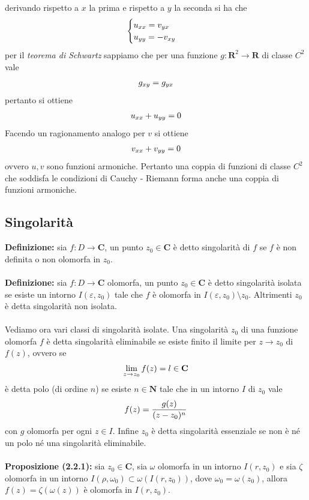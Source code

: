 \documentclass{article}
\begin{document}
derivando rispetto a $x$ la prima e rispetto a $y$ la seconda si ha che
\begin{gather}
    \begin{cases}
        u_{xx} = v_{yx} \\
        u_{yy} = -v_{xy}
    \end{cases} \notag
\end{gather}
per il \textit{teorema di Schwartz} sappiamo che per una funzione $g : \mathbf{R}^2 \longrightarrow \mathbf{R}$ di classe $C^2$ vale
\begin{gather}
    g_{xy} = g_{yx} \notag
\end{gather}
pertanto si ottiene
\begin{gather}
    u_{xx} + u_{yy} = 0 \notag
\end{gather}
Facendo un ragionamento analogo per $v$ si ottiene
\begin{gather}
    v_{xx} + v_{yy} = 0 \notag
\end{gather}
ovvero $u, v$ sono funzioni armoniche. Pertanto una coppia di funzioni di classe $C^2$ che soddisfa le condizioni di Cauchy - Riemann forma anche una coppia di funzioni armoniche.

\newpage
\subsection{Singolarità}
\textbf{Definizione:} sia $f : D \longrightarrow \mathbf{C}$, un punto $z_0 \in \mathbf{C}$ è detto singolarità di $f$ se $f$ è non definita o non olomorfa in $z_0$. \\ \\
\textbf{Definizione:} sia $f : D \longrightarrow \mathbf{C}$ olomorfa, un punto $z_0 \in \mathbf{C}$ è detto singolarità isolata se esiste un intorno $I(\varepsilon, z_0)$ tale che $f$ è olomorfa in $I(\varepsilon, z_0) \setminus z_0$. Altrimenti $z_0$ è detta singolarità non isolata. \\ \\
Vediamo ora vari classi di singolarità isolate. Una singolarità $z_0$ di una funzione olomorfa $f$ è detta singolarità eliminabile se esiste finito il limite per $z \rightarrow z_0$ di $f(z)$, ovvero se
\begin{gather}
    \lim_{z \rightarrow z_0}f(z) = l \in \mathbf{C} \notag
\end{gather}
è detta polo (di ordine $n$) se esiste $n \in \mathbf{N}$ tale che in un intorno $I$ di $z_0$ vale
\begin{gather}
    f(z) = \frac{g(z)}{(z - z_0)^n} \notag
\end{gather}
con $g$ olomorfa per ogni $z \in I$. Infine $z_0$ è detta singolarità essenziale se non è né un polo né una singolarità eliminabile. \\ \\
\textbf{Proposizione (2.2.1):} sia $z_0 \in \mathbf{C}$, sia $\omega$ olomorfa in un intorno $I(r, z_0)$ e sia $\zeta$ olomorfa in un intorno $I(\rho, \omega_0) \subset \omega(I(r, z_0))$, dove $\omega_0 = \omega(z_0)$, allora $f(z) = \zeta(\omega(z))$ è olomorfa in $I(r, z_0)$. \\
\end{document}

